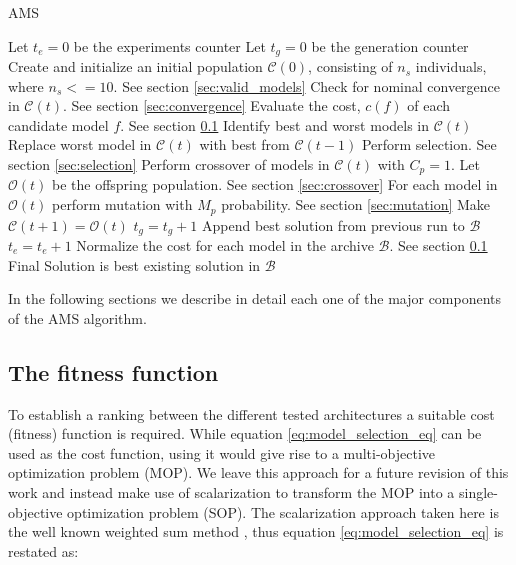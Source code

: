 \documentclass[journal]{IEEEtran}
\begin{document}
\begin{algorithm}[!htb]
\caption{AMS}
\begin{algorithmic}
\State Let $t_e = 0$ be the experiments counter
	\State Let $t_g = 0$ be the generation counter
	\State Create and initialize an initial population $\mathcal{C}(0)$, consisting of $n_s$ individuals, where $n_s <= 10$. See section \ref{sec:valid_models}
		\State Check for nominal convergence in $\mathcal{C}(t)$. See section \ref{sec:convergence}
		\State Evaluate the cost, $c(f)$ of each candidate model $f$. See section \ref{sec:fitness_function}
		\State Identify best and worst models in $\mathcal{C}(t)$
		\State Replace worst model in $\mathcal{C}(t)$ with best from $\mathcal{C}(t-1)$
		\State Perform selection. See section \ref{sec:selection}
		\State Perform crossover of models in $\mathcal{C}(t)$ with $C_p=1$. Let $\mathcal{O}(t)$ be the offspring population. See section \ref{sec:crossover}
		\State For each model in $\mathcal{O}(t)$ perform mutation with $M_p$ probability. See section \ref{sec:mutation}
		\State Make $\mathcal{C}(t+1) = \mathcal{O}(t)$ 
	    \State $t_g = t_g + 1$
	\EndWhile
	 \State Append best solution from previous run to $\mathcal{B}$
	 \State $t_e = t_e + 1$
\EndWhile
\State Normalize the cost for each model in the archive $\mathcal{B}$. See section \ref{sec:fitness_function}
\State Final Solution is best existing solution in $\mathcal{B}$
\end{algorithmic}
\label{algorithm:nn_ea}
\end{algorithm}

In the following sections we describe in detail each one of the major components of the AMS algorithm.


\subsection{The fitness function}
\label{sec:fitness_function}

To establish a ranking between the different tested architectures a suitable cost (fitness) function is required. While equation \ref{eq:model_selection_eq} can be used as the cost function, using it would give rise to a multi-objective optimization problem (MOP). We leave this approach for a future revision of this work and instead make use of scalarization to transform the MOP into a single- objective optimization problem (SOP). The scalarization approach taken here is the well known weighted sum method \cite{Hillermeier2001}, thus equation \ref{eq:model_selection_eq} is restated as: 
\end{document}
